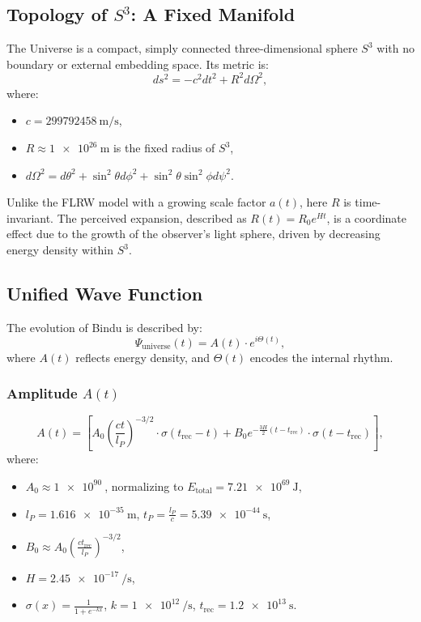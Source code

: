 \documentclass[11pt]{article}
\begin{document}
\subsection{Topology of $S^3$: A Fixed Manifold}
The Universe is a compact, simply connected three-dimensional sphere $S^3$ with no boundary or external embedding space. Its metric is:
\[
ds^2 = -c^2 dt^2 + R^2 d\Omega^2,
\]
where:
\begin{itemize}
    \item $c = \SI{299792458}{\meter\per\second}$,
    \item $R \approx \SI{1e26}{\meter}$ is the fixed radius of $S^3$,
    \item $d\Omega^2 = d\theta^2 + \sin^2\theta d\phi^2 + \sin^2\theta \sin^2\phi d\psi^2$.
\end{itemize}

Unlike the FLRW model with a growing scale factor $a(t)$, here $R$ is time-invariant. The perceived expansion, described as $R(t) = R_0 e^{Ht}$, is a coordinate effect due to the growth of the observer’s light sphere, driven by decreasing energy density within $S^3$.

\subsection{Unified Wave Function}
The evolution of Bindu is described by:
\[
\Psi_{\text{universe}}(t) = A(t) \cdot e^{i \Theta(t)},
\]
where $A(t)$ reflects energy density, and $\Theta(t)$ encodes the internal rhythm.

\subsubsection{Amplitude $A(t)$}
\[
A(t) = \left[ A_0 \left( \frac{c t}{l_P} \right)^{-3/2} \cdot \sigma(t_{\text{rec}} - t) + B_0 e^{-\frac{3H}{2}(t - t_{\text{rec}})} \cdot \sigma(t - t_{\text{rec}}) \right],
\]
where:
\begin{itemize}
    \item $A_0 \approx \SI{1e90}{}$, normalizing to $E_{\text{total}} = \SI{7.21e69}{\joule}$,
    \item $l_P = \SI{1.616e-35}{\meter}$, $t_P = \frac{l_P}{c} = \SI{5.39e-44}{\second}$,
    \item $B_0 \approx A_0 \left( \frac{c t_{\text{rec}}}{l_P} \right)^{-3/2}$,
    \item $H = \SI{2.45e-17}{\per\second}$,
    \item $\sigma(x) = \frac{1}{1 + e^{-kx}}$, $k = \SI{1e12}{\per\second}$, $t_{\text{rec}} = \SI{1.2e13}{\second}$.
\end{itemize}
\end{document}
